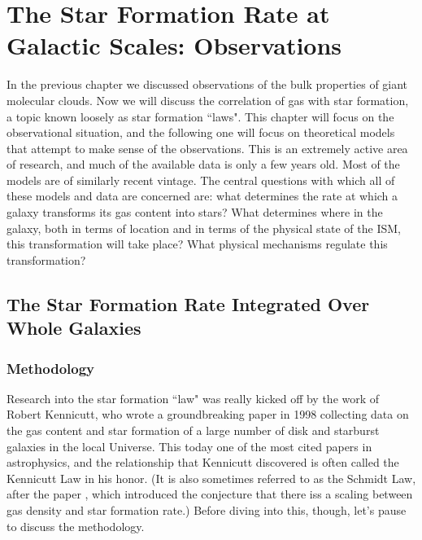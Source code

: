 \chapter{The Star Formation Rate at Galactic Scales: Observations}
\label{ch:sflaw_obs}


In the previous chapter we discussed observations of the bulk properties of giant molecular clouds. Now we will discuss the correlation of gas with star formation, a topic known loosely as star formation ``laws". This chapter will focus on the observational situation, and the following one will focus on theoretical models that attempt to make sense of the observations. This is an extremely active area of research, and much of the available data is only a few years old. Most of the models are of similarly recent vintage. The central questions with which all of these models and data are concerned are: what determines the rate at which a galaxy transforms its gas content into stars? What determines where in the galaxy, both in terms of location and in terms of the physical state of the ISM, this transformation will take place? What physical mechanisms regulate this transformation? 

\section{The Star Formation Rate Integrated Over Whole Galaxies}

\subsection{Methodology}

Research into the star formation ``law" was really kicked off by the work of Robert Kennicutt, who wrote a groundbreaking paper in 1998 \citep{kennicutt98a} collecting data on the gas content and star formation of a large number of disk and starburst galaxies in the local Universe. This today one of the most cited papers in astrophysics, and the relationship that Kennicutt discovered is often called the Kennicutt Law in his honor. (It is also sometimes referred to as the Schmidt Law, after the paper \citet{schmidt59a}, which introduced the conjecture that there iss a scaling between gas density and star formation rate.) Before diving into this, though, let's pause to discuss the methodology.

